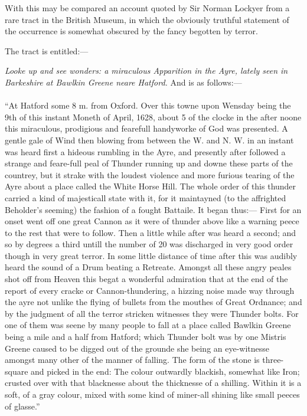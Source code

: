 \documentclass[a4paper, 12pt, oneside]{article}
\begin{document}
With this may be compared an account quoted by Sir Norman Lockyer from a rare tract in the British Museum, in which the obviously truthful statement of the occurrence is somewhat obscured by the fancy begotten by terror. 

The tract is entitled:--- 
\begin{center}
\emph{Looke up and see wonders: a miraculous Apparition in the Ayre, lately seen in Barkeshire at Bawlkin Greene neare Hatford.} And is as follows:--- 
\end{center}
\paragraph{}
``At Hatford some 8 m. from Oxford. Over this towne upon Wensday being the 9th of this instant Moneth of April, 1628, about 5 of the clocke in the after noone this miraculous, prodigious and fearefull handyworke of God was presented. A gentle gale of Wind then blowing from between the W. and N. W. in an instant was heard first a hideous rumbling in the Ayre, and presently after followed a strange and feare-full peal of Thunder running up and downe these parts of the countrey, but it strake with the loudest violence and more furious tearing of the Ayre about a place called the White Horse Hill. The whole order of this thunder carried a kind of majesticall state with it, for it maintayned (to the affrighted Beholder's seeming) the fashion of a fought Battaile. It began thus:--- First for an onset went off one great Cannon as it were of thunder above like a warning peece to the rest that were to follow. Then a little while after was heard a second; and so by degrees a third untill the number of 20 was discharged in very good order though in very great terror. In some little distance of time after this was audibly heard the sound of a Drum beating a Retreate. Amongst all these angry peales shot off from Heaven this begat a wonderful admiration that at the end of the report of every cracke or Cannon-thundering, a hizzing noise made way through the ayre not unlike the flying of bullets from the mouthes of Great Ordnance; and by the judgment of all the terror stricken witnesses they were Thunder bolts. For one of them was seene by many people to fall at a place called Bawlkin Greene being a mile and a half from Hatford; which Thunder bolt was by one Mistris Greene caused to be digged out of the grounde she being an eye-witnesse amongst many other of the manner of falling. The form of the stone is three-square and picked in the end: The colour outwardly blackish, somewhat like Iron; crusted over with that blacknesse about the thicknesse of a shilling. Within it is a soft, of a gray colour, mixed with some kind of miner-all shining like small peeces of glasse.''
\end{document}
